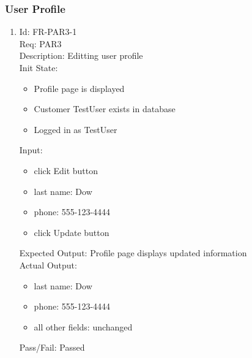 \documentclass[12pt, titlepage]{article}
\begin{document}
\subsubsection{User Profile}
\begin{enumerate}
    \item Id: FR-PAR3-1\\
    Req: PAR3\\
    Description: Editting user profile\\
    Init State: \begin{itemize}[noitemsep,topsep=0pt]
        \item Profile page is displayed
        \item Customer TestUser exists in database
        \item Logged in as TestUser
    \end{itemize}
    Input: \begin{itemize}[noitemsep,topsep=0pt]
        \item click Edit button
        \item last name: Dow
        \item phone: 555-123-4444
        \item click Update button
    \end{itemize}
    Expected Output: Profile page displays updated information\\ 
    Actual Output: \begin{itemize}[noitemsep,topsep=0pt]
        \item last name: Dow
        \item phone: 555-123-4444
        \item all other fields: unchanged
    \end{itemize}
    Pass/Fail: Passed


\end{enumerate}
\end{document}

